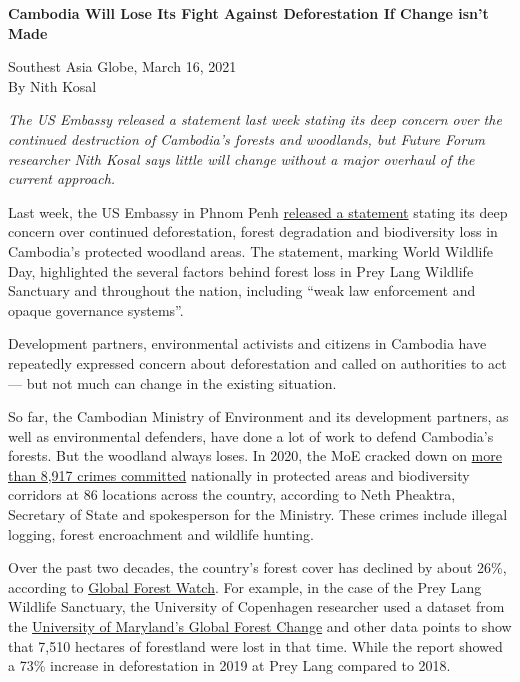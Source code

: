 \documentclass[10pt,a4paper]{letter}
\begin{document}
	
{\Large 
	\textbf{Cambodia Will Lose Its Fight Against Deforestation If Change isn't Made}
} 

Southest Asia Globe, March 16, 2021 \\
By Nith Kosal

\textit{The US Embassy released a statement last week stating its deep concern over the continued destruction of Cambodia's forests and woodlands, but Future Forum researcher Nith Kosal says little will change without a major overhaul of the current approach.}

Last week, the US Embassy in Phnom Penh \href{https://kh.usembassy.gov/u-s-embassy-phnom-penh-cambodia-statement-on-prey-lang-wildlife-sanctuary/}{released a statement} stating its deep concern over continued deforestation, forest degradation and biodiversity loss in Cambodia's protected woodland areas. The statement, marking World Wildlife Day, highlighted the several factors behind forest loss in Prey Lang Wildlife Sanctuary and throughout the nation, including ``weak law enforcement and opaque governance systems''.


Development partners, environmental activists and citizens in Cambodia have repeatedly expressed concern about deforestation and called on authorities to act --- but not much can change in the existing situation.

So far, the Cambodian Ministry of Environment and its development partners, as well as environmental defenders, have done a lot of work to defend Cambodia's forests. But the woodland always loses. In 2020, the MoE cracked down on \href{https://thmeythmey.com/?page=detail&id=100708}{more than 8,917 crimes committed} nationally in protected areas and biodiversity corridors at 86 locations across the country, according to Neth Pheaktra, Secretary of State and spokesperson for the Ministry. These crimes include illegal logging, forest encroachment and wildlife hunting.

Over the past two decades, the country's forest cover has declined by about 26\%, according to \href{https://www.globalforestwatch.org/dashboards/country/KHM/}{Global Forest Watch}. For example, in the case of the Prey Lang Wildlife Sanctuary, the University of Copenhagen researcher used a dataset from the \href{https://www.voacambodia.com/a/govt-usaid-criticized-for-inaction-over-severe-forest-loss-at-prey-lang-sanctuary/5478565.html}{University of Maryland's Global Forest Change} and other data points to show that 7,510 hectares of forestland were lost in that time. While the report showed a 73\% increase in deforestation in 2019 at Prey Lang compared to 2018.
\end{document}
